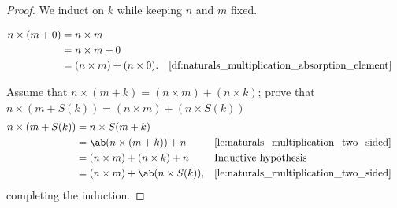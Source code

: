 \begin{proof}
  We induct on \(k\) while keeping \(n\) and \(m\) fixed.

  \basecase
  \begin{align}
    n \times (m + 0) & = n \times m                                                                                      \\
                     & = n \times m + 0                                                                                  \\
                     & = (n \times m) + (n \times 0). &  & \textrm{\Cref{df:naturals_multiplication_absorption_element}}
  \end{align}

  \inductivestep Assume that \(n \times (m + k) = (n \times m) + (n \times k)\); prove that
  \(n \times (m + S(k)) = (n \times m) + (n \times S(k))\)
  \begin{align}
    n \times (m + S(k)) & = n \times S(m + k)                                                                            \\
                        & = \ab(n \times (m + k)) + n          &  & \textrm{\Cref{le:naturals_multiplication_two_sided}} \\
                        & = (n \times m) + (n \times k) + n    &  & \textrm{Inductive hypothesis}                        \\
                        & = (n \times m) + \ab(n \times S(k)), &  & \textrm{\Cref{le:naturals_multiplication_two_sided}}
  \end{align}
  completing the induction.
\end{proof}

